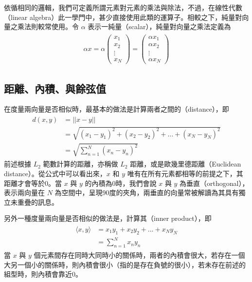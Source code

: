\documentclass[letterpaper,10pt,english]{sphinxmanual}
\begin{document}
依循相同的邏輯，我們可定義所謂元素對元素的乘法與除法，不過，在線性代數（linear algebra）此一學門中，甚少直接使用此類的運算子。相較之下，純量對向量之乘法則較常使用。令 \(\alpha\) 表示一純量（scalar），純量對向量之乘法定義為
\begin{equation*}
\begin{split}
\begin{aligned}
\alpha x =
\alpha
\begin{pmatrix}
x_1 \\
x_2 \\
\vdots \\
x_N
\end{pmatrix}
=
\begin{pmatrix}
\alpha x_1 \\
\alpha x_2 \\
\vdots \\
\alpha x_N
\end{pmatrix}
\end{aligned}
\end{split}
\end{equation*}

\subsection{距離、內積、與餘弦值}
\label{\detokenize{notebook/mathematics-prerequisite:id5}}
在度量兩向量是否相似時，最基本的做法是計算兩者之間的（distance），即
\begin{equation*}
\begin{split}
\begin{aligned}
d(x, y) &= ||x - y|| \\
&=
\sqrt{(x_1 - y_1)^2 + (x_2 - y_2)^2 + ... + (x_N - y_N)^2} \\
&=
\sqrt{\sum_{n=1}^N (x_n - y_n)^2 }
\end{aligned}
\end{split}
\end{equation*}
前述根據 \(L_2\) 範數計算的距離，亦稱做 \(L_2\) 距離，或是歐幾里德距離（Euclidean distance）。從公式中可以看出來，\(x\) 和 \(y\) 唯有在所有元素都相等的前提之下，其距離才會等於0。當 \(x\) 與 \(y\) 的內積為0時，我們會說 \(x\) 與 \(y\) 為垂直（orthogonal），表示兩向量在 \(N\) 為空間中，呈現90度的夾角，兩垂直的向量常被解讀為其具有獨立未重疊的訊息。

另外一種度量兩向量是否相似的做法是，計算其（inner product），即
\begin{equation*}
\begin{split}
\begin{aligned}
\langle x,y \rangle &=
x_1 y_1 + x_2 y_2 + ... + x_N y_N \\
& = \sum_{n=1}^N x_n y_n
\end{aligned}
\end{split}
\end{equation*}
當 \(x\) 與 \(y\) 個元素間存在同時大同時小的關係時，兩者的內積會很大，若存在一個大另一個小的關係時，則內積會很小（指的是存在負號的很小），若未存在前述的組型時，則內積會靠近0。
\end{document}
